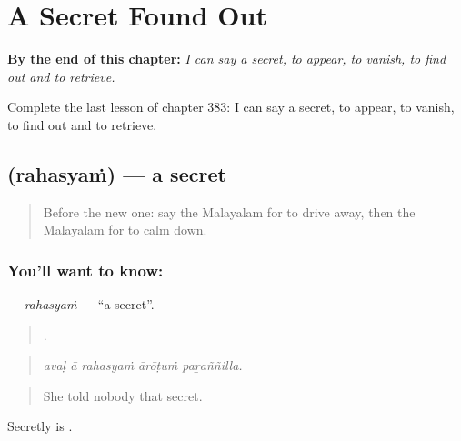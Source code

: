 
\chapter{A Secret Found Out}
\label{ch:ml-a-secret-found-out}

\begin{chapteropening}
\textbf{By the end of this chapter:} \emph{I can say a secret, to appear, to vanish, to find out and to retrieve.}

Complete the last lesson of chapter 383: I can say a secret, to appear, to vanish, to find out and to retrieve.
\end{chapteropening}

\section[\texorpdfstring{\ml{രഹസ്യം} (rahasyaṁ)}{രഹസ്യം (rahasyaṁ)}]{ (rahasyaṁ) — a secret}

\label{lesson:ML-C383-rahasyam}



\begin{quote}
Before the new one: say the Malayalam for to drive away, then the Malayalam for to calm down.
\end{quote}

\subsection*{You'll want to know: }
\textbf{} — \emph{rahasyaṁ} — \textquotedblleft{}a secret\textquotedblright{}.

\begin{quote}
    .
\end{quote}

\begin{quote}
\emph{avaḷ ā rahasyaṁ ārōṭuṁ paṟaññilla.}
\end{quote}

\begin{quote}
She told nobody that secret.
\end{quote}

Secretly is .


